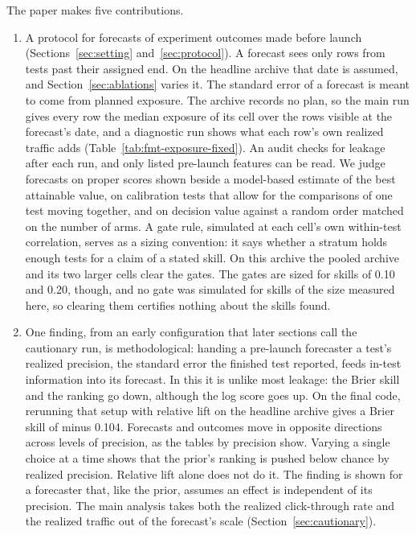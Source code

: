 \documentclass[sigconf,nonacm]{acmart}
\begin{document}
The paper makes five contributions.
\begin{enumerate}
\item A protocol for forecasts of experiment outcomes made before launch (Sections~\ref{sec:setting} and~\ref{sec:protocol}). A forecast sees only rows from tests past their assigned end. On the headline archive that date is assumed, and Section~\ref{sec:ablations} varies it. The standard error of a forecast is meant to come from planned exposure. The archive records no plan, so the main run gives every row the median exposure of its cell over the rows visible at the forecast's date, and a diagnostic run shows what each row's own realized traffic adds (Table~\ref{tab:fmt-exposure-fixed}). An audit checks for leakage after each run, and only listed pre-launch features can be read. We judge forecasts on proper scores shown beside a model-based estimate of the best attainable value, on calibration tests that allow for the comparisons of one test moving together, and on decision value against a random order matched on the number of arms. A gate rule, simulated at each cell's own within-test correlation, serves as a sizing convention: it says whether a stratum holds enough tests for a claim of a stated skill. On this archive the pooled archive and its two larger cells clear the gates. The gates are sized for skills of 0.10 and 0.20, though, and no gate was simulated for skills of the size measured here, so clearing them certifies nothing about the skills found.
\item One finding, from an early configuration that later sections call the cautionary run, is methodological: handing a pre-launch forecaster a test's realized precision, the standard error the finished test reported, feeds in-test information into its forecast. In this it is unlike most leakage: the Brier skill and the ranking go down, although the log score goes up. On the final code, rerunning that setup with relative lift on the headline archive gives a Brier skill of minus 0.104. Forecasts and outcomes move in opposite directions across levels of precision, as the tables by precision show. Varying a single choice at a time shows that the prior's ranking is pushed below chance by realized precision. Relative lift alone does not do it. The finding is shown for a forecaster that, like the prior, assumes an effect is independent of its precision. The main analysis takes both the realized click-through rate and the realized traffic out of the forecast's scale (Section~\ref{sec:cautionary}).

\end{enumerate}
\end{document}
